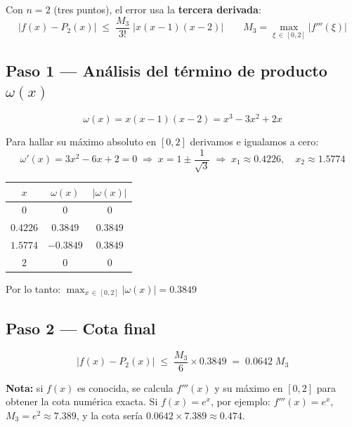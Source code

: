 \documentclass[12pt,a4paper]{article}
\begin{document}
Con $n=2$ (tres puntos), el error usa la \textbf{tercera derivada}:
\[
  \bigl|f(x) - P_2(x)\bigr|
  \;\leq\;
  \frac{M_3}{3!}\;\bigl|x(x-1)(x-2)\bigr|
  \qquad
  M_3 = \max_{\xi\,\in\,[0,2]}\bigl|f'''(\xi)\bigr|
\]

\subsection*{Paso 1 \;---\; An\'alisis del t\'ermino de producto $\omega(x)$}

\[
  \omega(x) = x(x-1)(x-2) = x^3 - 3x^2 + 2x
\]

Para hallar su m\'aximo absoluto en $[0,2]$ derivamos e igualamos a cero:
\[
  \omega'(x) = 3x^2 - 6x + 2 = 0
  \;\Longrightarrow\;
  x = 1 \pm \frac{1}{\sqrt{3}}
  \;\Longrightarrow\;
  x_1 \approx 0.4226, \quad x_2 \approx 1.5774
\]

\begin{center}
\begin{tabular}{ccc}
  \toprule
  $x$ & $\omega(x)$ & $|\omega(x)|$ \\
  \midrule
  $0$      & $0$       & $0$ \\
  $0.4226$ & $0.3849$  & $0.3849$ \\
  $1.5774$ & $-0.3849$ & $0.3849$ \\
  $2$      & $0$       & $0$ \\
  \bottomrule
\end{tabular}
\end{center}

Por lo tanto: $\displaystyle\max_{x\,\in\,[0,2]}|\omega(x)| = 0.3849$

\subsection*{Paso 2 \;---\; Cota final}

\[
  \boxed{
    \bigl|f(x) - P_2(x)\bigr|
    \;\leq\;
    \frac{M_3}{6}\times 0.3849
    \;=\;
    0.0642\;M_3
  }
\]

\textbf{Nota:} si $f(x)$ es conocida, se calcula $f'''(x)$ y su m\'aximo en $[0,2]$
para obtener la cota num\'erica exacta. Si $f(x)=e^x$, por ejemplo:
$f'''(x)=e^x$, $M_3=e^2\approx 7.389$, y la cota ser\'ia
$0.0642\times 7.389 \approx 0.474$.
\end{document}
